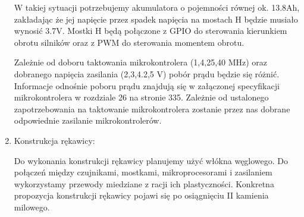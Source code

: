 \documentclass[a4paper]{article}
\begin{document}
\begin{enumerate}
W takiej sytuacji potrzebujemy akumulatora o pojemności równej ok. 13.8Ah, zakładając że jej napięcie przez spadek napięcia na mostach H będzie musiało wynosić 3.7V. Mostki H będą połączone z GPIO do sterowania kierunkiem obrotu silników oraz z PWM do sterowania momentem obrotu.

Zależnie od doboru taktowania mikrokontrolera (1,4,25,40 MHz) oraz dobranego napięcia zasilania (2,3,4.2,5 V) pobór prądu będzie się różnić. Informacje odnośnie poboru prądu znajdują się w załączonej specyfikacji mikrokontrolera w rozdziale 26 na stronie 335. Zależnie od ustalonego zapotrzebowania na taktowanie mikrokontrolera zostanie przez nas dobrane odpowiednie zasilanie mikrokontrolerów.

\item Konstrukcja rękawicy:

Do wykonania konstrukcji rękawicy planujemy użyć włókna węglowego. Do połączeń między czujnikami, mostkami, mikroprocesorami i zasilaniem wykorzystamy przewody miedziane z racji ich plastyczności. Konkretna propozycja konstrukcji rękawicy pojawi się po osiągnięciu II kamienia milowego.

\end{enumerate}
\end{document}
